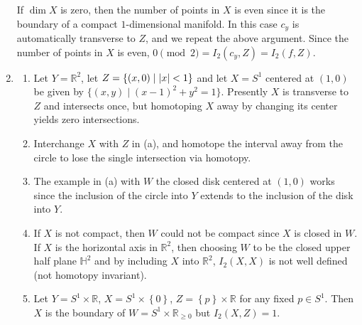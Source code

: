 \documentclass[11pt,leqno]{article}
\theoremstyle{plain}
\theoremstyle{definition}
\numberwithin{equation}{section}
\numberwithin{lem}{section}
\newcommand{\cbr}[1]{\left\{#1\right\}}
\begin{document}
\begin{enumerate}
    If $\dim X$ is zero, then the number of points in $X$ is even since it is the boundary of a compact $1$-dimensional manifold. In this case $c_y$ is automatically transverse to $Z$, and we repeat the above argument. Since the number of points in $X$ is even, $0 \pmod 2 = I_2(c_y, Z) = I_2(f,Z)$. 
    \item \begin{enumerate}
        \item Let $Y = \mathbb R^2$, let $Z = \cbr{(x,0)\mid \abs{x} < 1}$ and let $X = S^1$ centered at $(1,0)$ be given by $\{(x,y)\mid (x-1)^2+y^2=1\}$. Presently $X$ is transverse to $Z$ and intersects once, but homotoping $X$ away by changing its center yields zero intersections.
        \item Interchange $X$ with $Z$ in (a), and homotope the interval away from the circle to lose the single intersection via homotopy.
        \item The example in (a) with $W$ the closed disk centered at $(1,0)$ works since the inclusion of the circle into $Y$ extends to the inclusion of the disk into $Y$.
        \item If $X$ is not compact, then $W$ could not be compact since $X$ is closed in $W$. If $X$ is the horizontal axis in $\mathbb R^2$, then choosing $W$ to be the closed upper half plane $\mathbb H^2$ and by including $X$ into $\mathbb R^2$, $I_2(X,X)$ is not well defined (not homotopy invariant).
        \item Let $Y = S^1\times \mathbb R$, $X = S^1\times \cbr{0}$, $Z = \cbr{p}\times\mathbb R$ for any fixed $p\in S^1$. Then $X$ is the boundary of $W = S^1\times \mathbb R_{\geq 0}$ but $I_2(X,Z) = 1$.
    \end{enumerate}
\end{enumerate}
\end{document}
